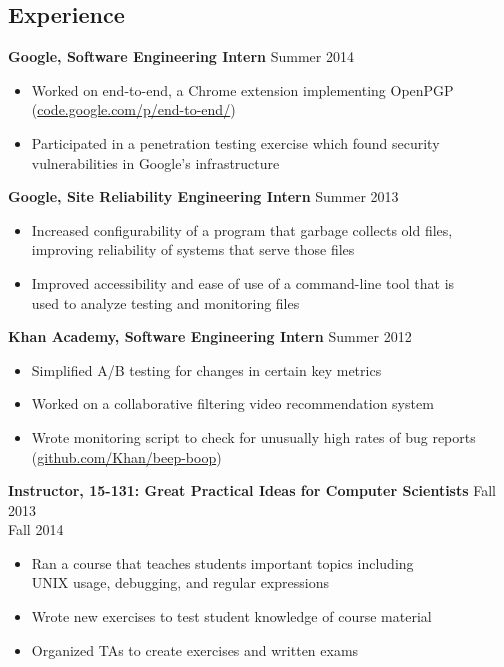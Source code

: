 \documentclass[margin]{res}
\begin{document}
\begin{resume}
\section{Experience}
  \textbf{Google, Software Engineering Intern} \hfill Summer 2014
  \begin{itemize} \itemsep -2pt  %
    \item Worked on end-to-end, a Chrome extension implementing OpenPGP\\
      (\href{https://code.google.com/p/end-to-end/}{code.google.com/p/end-to-end/})
    \item Participated in a penetration testing exercise which found security\\
      vulnerabilities in Google's infrastructure
  \end{itemize}
  \textbf{Google, Site Reliability Engineering Intern}
    \hfill Summer 2013
  \begin{itemize} \itemsep -2pt  %
    \item Increased configurability of a program that garbage collects old files,\\
          improving reliability of systems that serve those files
    \item Improved accessibility and ease of use of a command-line tool that is\\
          used to analyze testing and monitoring files
  \end{itemize}

  \textbf{Khan Academy, Software Engineering Intern} \hfill Summer 2012
  \begin{itemize} \itemsep -2pt %
  \item Simplified A/B testing for changes in certain key metrics
  \item Worked on a collaborative filtering video recommendation system
  \item Wrote monitoring script to check for unusually
    high rates of bug reports\\
    (\href{https://github.com/Khan/beep-boop}{github.com/Khan/beep-boop})
  \end{itemize}

  \textbf{Instructor, 15-131: Great Practical Ideas for Computer Scientists}
    \hfill Fall 2013 \\ \hphantom{1em} \hfill Fall 2014

  \vspace{-1em}\vspace{-1ex}
  \begin{itemize} \itemsep -2pt
    \item Ran a course that teaches students important topics including\\
      UNIX usage, debugging, and regular expressions
    \item Wrote new exercises to test student knowledge of course material
    \item Organized TAs to create exercises and written exams
  \end{itemize}


\end{resume}
\end{document}
